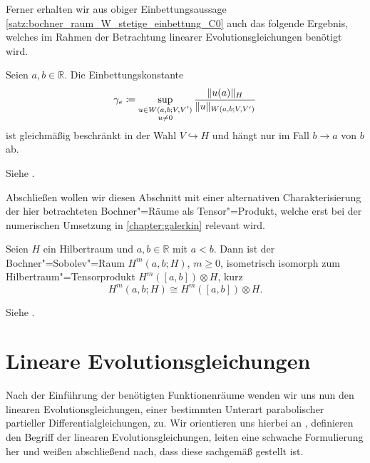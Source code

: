 Ferner erhalten wir aus obiger Einbettungsaussage \cref{satz:bochner_raum_W_stetige_einbettung_C0} auch das folgende Ergebnis, welches im Rahmen der Betrachtung linearer Evolutionsgleichungen benötigt wird.

\begin{Korollar}
\label{korollar:einbettungskonstante_M_e}
    Seien $a, b \in \mathbb{R}$.
    Die Einbettungskonstante
    \begin{equation}
        \label{eq:einbettungskonstante_M_e}
        \gamma_{e} \coloneqq \sup_{\substack{u\in W(a, b; V, V')\\u \neq 0}} \frac{\lVert u(a)\rVert_{H}}{\lVert u\rVert_{W(a, b; V, V')}}
    \end{equation}
    ist gleichmäßig beschränkt in der Wahl $V \hookrightarrow H$ und hängt nur im Fall $b \to a$ von $b$ ab.

    \begin{Beweis}
        Siehe \cites[Section 5]{Schwab:2009ec}[Beweis zu Theorem XVIII.2.1]{Dautray:1992by}.
    \end{Beweis}
\end{Korollar}

Abschließen wollen wir diesen Abschnitt mit einer alternativen Charakterisierung der hier betrachteten Bochner"=Räume als Tensor"=Produkt, welche erst bei der numerischen Umsetzung in \cref{chapter:galerkin} relevant wird.

\begin{Satz}
\label{satz:bochner_sobolev_raum_als_tensorprodukt}
    Seien $H$ ein Hilbertraum und $a, b \in \mathbb{R}$ mit $a < b$.
    Dann ist der Bochner"=Sobolev"=Raum $H^{m}(a, b; H)$, $m \geq 0$, isometrisch isomorph zum Hilbertraum"=Tensorprodukt $H^{m}([a, b]) \otimes H$, kurz
    \begin{equation}
        H^{m}(a, b; H) \cong H^{m}([a, b]) \otimes H.
    \end{equation}

    \begin{Beweis}
        Siehe \cite[Theorem 12.6.1, Theorem 12.7.1]{Aubin:2000un}.
    \end{Beweis}
\end{Satz}


\section{Lineare Evolutionsgleichungen} %
\label{section:lineare_evolutionsgleichungen}

Nach der Einführung der benötigten Funktionenräume wenden wir uns nun den linearen Evolutionsgleichungen, einer bestimmten Unterart parabolischer partieller Differentialgleichungen, zu.
Wir orientieren uns hierbei an \textcite{Lions:1971wp,Schwab:2009ec,Urban:2014kg},
definieren den Begriff der linearen Evolutionsgleichungen, leiten eine schwache Formulierung her und weißen abschließend nach, dass diese sachgemäß gestellt ist.

